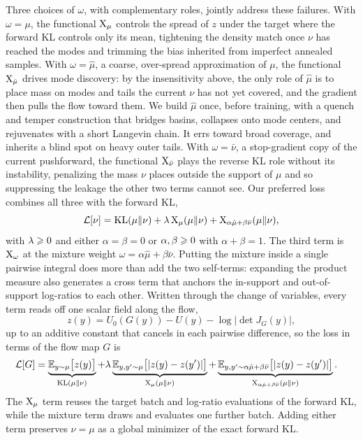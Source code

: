 \documentclass{article}
\begin{document}
Three choices of $\omega$, with complementary roles, jointly address these failures. With $\omega=\mu$, the functional $\mathrm{X}_\mu$ controls the spread of $z$ under the target where the forward KL controls only its mean, tightening the density match once $\nu$ has reached the modes and trimming the bias inherited from imperfect annealed samples. With $\omega=\hat\mu$, a coarse, over-spread approximation of $\mu$, the functional $\mathrm{X}_{\hat\mu}$ drives mode discovery: by the insensitivity above, the only role of $\hat\mu$ is to place mass on modes and tails the current $\nu$ has not yet covered, and the gradient then pulls the flow toward them. We build $\hat\mu$ once, before training, with a quench and temper construction that bridges basins, collapses onto mode centers, and rejuvenates with a short Langevin chain. It errs toward broad coverage, and inherits a blind spot on heavy outer tails. With $\omega=\bar\nu$, a stop-gradient copy of the current pushforward, the functional $\mathrm{X}_{\bar\nu}$ plays the reverse KL role without its instability, penalizing the mass $\nu$ places outside the support of $\mu$ and so suppressing the leakage the other two terms cannot see. Our preferred loss combines all three with the forward KL,
\begin{equation}
    \mathcal{L}[\nu] = \mathrm{KL}(\mu\|\nu) + \lambda\, \mathrm{X}_\mu(\mu\|\nu) + \mathrm{X}_{\alpha\hat\mu + \beta\bar\nu}(\mu\|\nu),
    \label{eq: total-loss}
\end{equation}
with $\lambda\geqslant 0$ and either $\alpha=\beta=0$ or $\alpha,\beta\geqslant0$ with $\alpha+\beta=1$. The third term is $\mathrm{X}_\omega$ at the mixture weight $\omega=\alpha\hat\mu+\beta\bar\nu$. Putting the mixture inside a single pairwise integral does more than add the two self-terms: expanding the product measure also generates a cross term that anchors the in-support and out-of-support log-ratios to each other. Written through the change of variables, every term reads off one scalar field along the flow,
\begin{equation}
    z(y) = U_0(G(y)) - U(y) - \log|\det J_G(y)|,
    \label{eq: logratio-z}
\end{equation}
up to an additive constant that cancels in each pairwise difference, so the loss in terms of the flow map $G$ is
\begin{align}
    \mathcal{L}[G]
    &= \underbrace{\mathbb{E}_{y \sim \mu}\bigl[z(y)\bigr]}_{\mathrm{KL}(\mu\|\nu)}
     + \lambda \underbrace{\mathbb{E}_{y, y' \sim \mu}\bigl[|z(y) - z(y')|\bigr]}_{\mathrm{X}_\mu(\mu\|\nu)}
     + \underbrace{\mathbb{E}_{y, y' \sim \alpha\hat\mu + \beta\bar\nu}\bigl[|z(y) - z(y')|\bigr]}_{\mathrm{X}_{\alpha\hat\mu + \beta\bar\nu}(\mu\|\nu)} .
    \label{eq: total-loss-G-intro}
\end{align}
The $\mathrm{X}_\mu$ term reuses the target batch and log-ratio evaluations of the forward KL, while the mixture term draws and evaluates one further batch. Adding either term preserves $\nu=\mu$ as a global minimizer of the exact forward KL.
\end{document}

